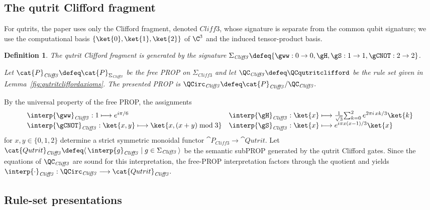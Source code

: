\documentclass[10pt,a4paper]{article}
\newtheorem{definition}[theorem]{Definition}
\def\cref#1{Lemma~\ref{#1}}%
\begin{document}
\subsection{The qutrit Clifford fragment}
\label{subsec:qutrit-clifford-fragment}

For qutrits, the paper uses only the Clifford fragment, denoted \(\mathit{Cliff3}\), whose
signature is separate from the common qubit signature; we use the computational basis
\(\{\ket{0},\ket{1},\ket{2}\}\) of \(\C^3\) and the induced tensor-product basis.

\begin{definition}\label{def:qutrit-clifford-fragment}
The \emph{qutrit Clifford} fragment is generated by the signature
\(\Sigma_{\mathit{Cliff3}}\defeq
\{\gww:0\to0,\gH,\gS:1\to1,\gCNOT:2\to2\}\).

Let \(\cat{P}_{\mathit{Cliff3}}\defeq\cat{P}_{\Sigma_{\mathit{Cliff3}}}\) be the free PROP on
\(\Sigma_{\mathit{Cliff3}}\) and let \(\QC_{\mathit{Cliff3}}\defeq\QCqutritclifford\) be the rule
set given in \cref{fig:qutritcliffordaxioms}.  The presented PROP is
\(
  \QCirc_{\mathit{Cliff3}}\defeq\cat{P}_{\mathit{Cliff3}}/\QC_{\mathit{Cliff3}}.
\)
\end{definition}

By the universal property of the free PROP, the assignments
\begin{equation*}
\begin{array}{l l}
 \interp{\gww}_{\mathit{Cliff3}} : 1\longmapsto e^{i\pi/6} & 
 \interp{\gH}_{\mathit{Cliff3}} : \ket{x}\longmapsto 
   \tfrac1{\sqrt3}\!\sum_{k=0}^2 e^{2\pi i\,xk/3}\ket{k} \\
 \interp{\gCNOT}_{\mathit{Cliff3}} : \ket{x,y}\longmapsto \ket{x,(x+y)\bmod 3} &
 \interp{\gS}_{\mathit{Cliff3}} : \ket{x}\longmapsto
   e^{i\pi x(x-1)/3}\ket{x} 
\end{array}
\end{equation*}
for \(x,y\in\{0,1,2\}\) determine a strict symmetric monoidal functor
\(\cat{P}_{\mathit{Cliff3}}\to\cat{Qutrit}\).  Let
\(\cat{Qutrit}_{\mathit{Cliff3}}\defeq\langle\,\interp{g}_{\mathit{Cliff3}}\mid g\in\Sigma_{\mathit{Cliff3}}\,\rangle\)
be the semantic subPROP generated by the qutrit Clifford gates.  Since the equations of
\(\QC_{\mathit{Cliff3}}\) are sound for this interpretation, the free-PROP interpretation factors
through the quotient and yields
\(
  \interp{\cdot}_{\mathit{Cliff3}}:\QCirc_{\mathit{Cliff3}}\longrightarrow\cat{Qutrit}_{\mathit{Cliff3}}.
\)

\subsection{Rule-set presentations}
\end{document}
